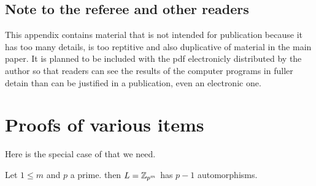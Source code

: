  {\protect\vspace{10pt} }

\subsection*{Note to the referee and other readers} This appendix contains material that is not 
intended for publication because it has too many details, is too reptitive
 and also duplicative of material in the main paper. It is planned to be 
included with the pdf electronicly distributed by the author 
so that readers can see the results of the computer 
programs in fuller detain than can be justified in a publication, even an electronic one.

\section{Proofs of various items}
Here is the special case of 
\cite[Thm. 4.1]{MR2363058} that we need.

\begin{prop}\label{propAutosOfZphatk} Let $1\le m$ and $p$ a prime. then
$L=\text{$\mathbb Z$}_{p^m}$ has $p-1$ automorphisms.
\end{prop}

